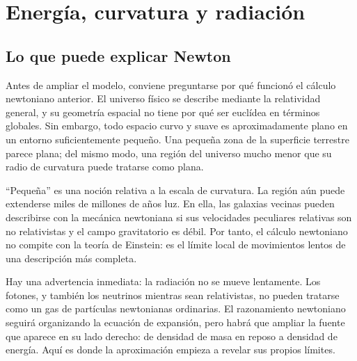 \chapter{Energía, curvatura y radiación}


\section{Lo que puede explicar Newton}

Antes de ampliar el modelo, conviene preguntarse por qué funcionó el cálculo newtoniano anterior. El universo físico se describe mediante la relatividad general, y su geometría espacial no tiene por qué ser euclídea en términos globales. Sin embargo, todo espacio curvo y suave es aproximadamente plano en un entorno suficientemente pequeño. Una pequeña zona de la superficie terrestre parece plana; del mismo modo, una región del universo mucho menor que su radio de curvatura puede tratarse como plana.

``Pequeña'' es una noción relativa a la escala de curvatura. La región aún puede extenderse miles de millones de años luz. En ella, las galaxias vecinas pueden describirse con la mecánica newtoniana si sus velocidades peculiares relativas son no relativistas y el campo gravitatorio es débil. Por tanto, el cálculo newtoniano no compite con la teoría de Einstein: es el límite local de movimientos lentos de una descripción más completa.

Hay una advertencia inmediata: la radiación no se mueve lentamente. Los fotones, y también los neutrinos mientras sean relativistas, no pueden tratarse como un gas de partículas newtonianas ordinarias. El razonamiento newtoniano seguirá organizando la ecuación de expansión, pero habrá que ampliar la fuente que aparece en su lado derecho: de densidad de masa en reposo a densidad de energía. Aquí es donde la aproximación empieza a revelar sus propios límites.

